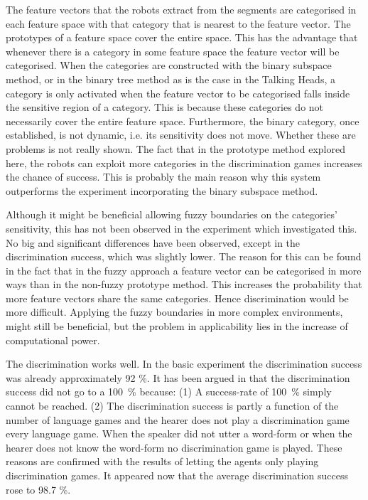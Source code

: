 The feature vectors that the robots extract from the segments are categorised in each feature space with that category that is nearest to the feature vector. The prototypes of a feature space cover the entire space. This has the advantage that whenever there is a category in some feature space the feature vector will be categorised. When the categories are constructed with the binary subspace method, or in the binary tree method \citep{steels:1996b} as is the case in the Talking Heads, a category is only activated when the feature vector to be categorised falls inside the sensitive region of a category. This is because these categories do not necessarily cover the entire feature space. Furthermore, the binary category, once established, is not dynamic, i.e. its sensitivity does not move. Whether these are problems is not really shown. The fact that in the prototype method explored here, the robots can exploit more categories in the discrimination games increases the chance of success. This is probably the main reason why this system outperforms the experiment incorporating the binary subspace method.

Although it might be beneficial allowing fuzzy boundaries on the categories' sensitivity, this has not been observed in the experiment which investigated this. No big and significant differences have been observed, except in the discrimination success, which was slightly lower. The reason for this can be found in the fact that in the fuzzy approach a feature vector can be categorised in more ways than in the non-fuzzy prototype method. This increases the probability that more feature vectors share the same categories. Hence discrimination would be more difficult. Applying the fuzzy boundaries in more complex environments, might still be beneficial, but the problem in applicability lies in the increase of computational power.


The discrimination works well. In the basic experiment the discrimination success was already approximately 92 \%. It has been argued in  that the discrimination success did not go to a 100~\% because: (1) A success-rate of 100~\% simply cannot be reached. (2) The discrimination success is partly a function of the number of language games and the hearer does not play a discrimination game every language game. When the speaker did not utter a word-form or when the hearer does not know the word-form no discrimination game is played. These reasons are confirmed with the results of letting the agents only playing discrimination games. It appeared now that the average discrimination success rose to 98.7 \%.

